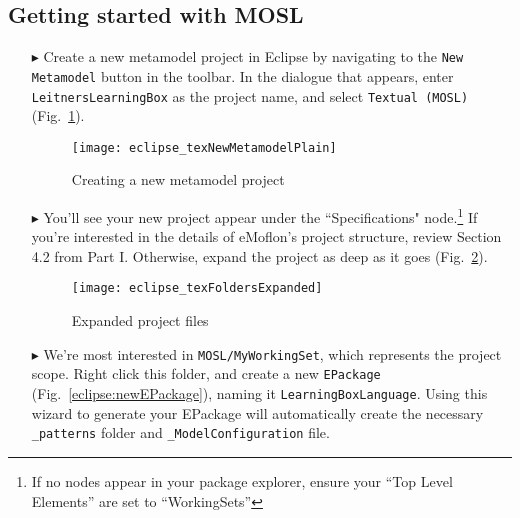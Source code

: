 \clearpage
\subsection{Getting started with MOSL}
\texHeader
\hypertarget{static:starting tex}{} 

\disclaimerForTextualSyntax

\begin{itemize}

\item[$\blacktriangleright$] Create a new metamodel project in Eclipse by navigating to the \texttt{New Metamodel} button in the toolbar. In the dialogue that
appears, enter \texttt{LeitnersLearningBox} as the project name, and select \texttt{Textual (MOSL)}  (Fig.~\ref{eclipse:newProject}).

\vspace{1cm}

\begin{figure}[htbp]
	\centering
  \texttt{[image: eclipse\_texNewMetamodelPlain]}
	\caption{Creating a new metamodel project}
	\label{eclipse:newProject}
\end{figure}

\vspace{1cm}

\item[$\blacktriangleright$] You'll see your new project appear under the ``Specifications" node.\footnote{If no nodes appear in your package explorer,
ensure your ``Top Level Elements'' are set to ``WorkingSets''} If you're interested in the details of eMoflon's project structure, review Section
4.2 from Part I. Otherwise, expand the project as deep as it goes (Fig.~\ref{eclipse:expandedFolders}).

\clearpage

\begin{figure}[htbp]
	\centering
  \texttt{[image: eclipse\_texFoldersExpanded]}
	\caption{Expanded project files}
	\label{eclipse:expandedFolders}
\end{figure} 

\vspace{0.5cm}

\item[$\blacktriangleright$] We're most interested in \texttt{MOSL/MyWorkingSet}, which represents the project scope. Right click this folder, and create a new
\texttt{EPackage} (Fig.~\ref{eclipse:newEPackage}), naming it \texttt{LearningBoxLanguage}. Using this wizard to generate your EPackage will automatically
create the necessary \texttt{\_patterns} folder and \texttt{\_ModelConfiguration} file.


\end{itemize}
